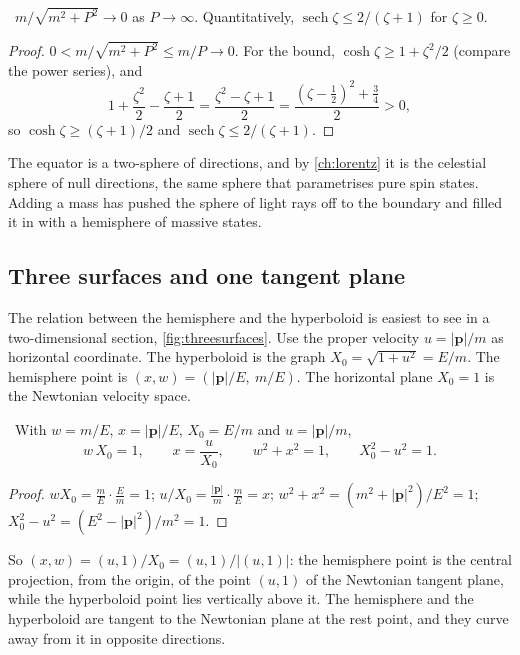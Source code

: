 \begin{proposition}\label{prop:equator}\ver\
$m/\sqrt{m^2+P^2}\to0$ as $P\to\infty$. Quantitatively, $\operatorname{sech}\zeta\le2/(\zeta+1)$ for $\zeta\ge0$.
\end{proposition}
\begin{proof}
$0<m/\sqrt{m^2+P^2}\le m/P\to0$. For the bound, $\cosh\zeta\ge1+\zeta^2/2$ (compare the power series), and
\[
1+\frac{\zeta^2}2-\frac{\zeta+1}2=\frac{\zeta^2-\zeta+1}2=\frac{(\zeta-\frac12)^2+\frac34}2>0,
\]
so $\cosh\zeta\ge(\zeta+1)/2$ and $\operatorname{sech}\zeta\le2/(\zeta+1)$.
\end{proof}


The equator is a two-sphere of directions, and by \cref{ch:lorentz} it is the celestial sphere of null directions, the same sphere that parametrises pure spin states. Adding a mass has pushed the sphere of light rays off to the boundary and filled it in with a hemisphere of massive states.

\subsection*{Three surfaces and one tangent plane}

The relation between the hemisphere and the hyperboloid is easiest to see in a two-dimensional section, \cref{fig:threesurfaces}. Use the proper velocity $u=|\mathbf p|/m$ as horizontal coordinate. The hyperboloid is the graph $X_0=\sqrt{1+u^2}=E/m$. The hemisphere point is $(x,w)=(|\mathbf p|/E,\ m/E)$. The horizontal plane $X_0=1$ is the Newtonian velocity space.

\begin{theorem}[Reciprocity]\label{thm:reciprocal}\ver\
With $w=m/E$, $x=|\mathbf p|/E$, $X_0=E/m$ and $u=|\mathbf p|/m$,
\[
w\,X_0=1,\qquad x=\frac{u}{X_0},\qquad w^2+x^2=1,\qquad X_0^2-u^2=1 .
\]
\end{theorem}
\begin{proof}
$wX_0=\frac mE\cdot\frac Em=1$; $u/X_0=\frac{|\mathbf p|}m\cdot\frac mE=x$; $w^2+x^2=(m^2+|\mathbf p|^2)/E^2=1$; $X_0^2-u^2=(E^2-|\mathbf p|^2)/m^2=1$.
\end{proof}


So $(x,w)=(u,1)/X_0=(u,1)/|(u,1)|$: the hemisphere point is the central projection, from the origin, of the point $(u,1)$ of the Newtonian tangent plane, while the hyperboloid point lies vertically above it. The hemisphere and the hyperboloid are tangent to the Newtonian plane at the rest point, and they curve away from it in opposite directions.

